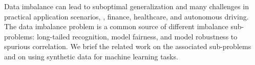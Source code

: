 Data imbalance can lead to
suboptimal generalization and many challenges
in practical application scenarios, \eg, finance, healthcare, and autonomous driving.
The data imbalance problem is a common source of different imbalance sub-problems: long-tailed recognition, model fairness, and model robustness to spurious correlation.
We brief the related work on the associated sub-problems and on using synthetic data for machine learning tasks.












